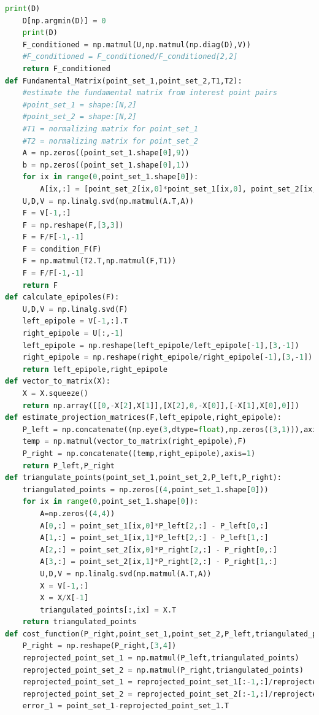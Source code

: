 \documentclass{article}
\begin{document}
\begin{lstlisting}[language=Python]
	print(D)
	D[np.argmin(D)] = 0
	print(D)
	F_conditioned = np.matmul(U,np.matmul(np.diag(D),V))
	#F_conditioned = F_conditioned/F_conditioned[2,2]
	return F_conditioned
def Fundamental_Matrix(point_set_1,point_set_2,T1,T2):
	#estimate the fundamental matrix from interest point pairs
	#point_set_1 = shape:[N,2]
	#point_set_2 = shape:[N,2]
	#T1 = normalizing matrix for point_set_1
	#T2 = normalizing matrix for point_set_2
	A = np.zeros((point_set_1.shape[0],9))
	b = np.zeros((point_set_1.shape[0],1))
	for ix in range(0,point_set_1.shape[0]):
		A[ix,:] = [point_set_2[ix,0]*point_set_1[ix,0], point_set_2[ix,0]*point_set_1[ix,1], point_set_2[ix,0], point_set_2[ix,1]*point_set_1[ix,0], point_set_2[ix,1]*point_set_1[ix,1], point_set_2[ix,1], point_set_1[ix,0], point_set_1[ix,1], 1]
	U,D,V = np.linalg.svd(np.matmul(A.T,A))
	F = V[-1,:]
	F = np.reshape(F,[3,3])
	F = F/F[-1,-1]
	F = condition_F(F)
	F = np.matmul(T2.T,np.matmul(F,T1))
	F = F/F[-1,-1]
	return F
def calculate_epipoles(F):
	U,D,V = np.linalg.svd(F)
	left_epipole = V[-1,:].T
	right_epipole = U[:,-1]
	left_epipole = np.reshape(left_epipole/left_epipole[-1],[3,-1])
	right_epipole = np.reshape(right_epipole/right_epipole[-1],[3,-1])
	return left_epipole,right_epipole
def vector_to_matrix(X):
	X = X.squeeze()
	return np.array([[0,-X[2],X[1]],[X[2],0,-X[0]],[-X[1],X[0],0]])
def estimate_projection_matrices(F,left_epipole,right_epipole):
	P_left = np.concatenate((np.eye(3,dtype=float),np.zeros((3,1))),axis=1)
	temp = np.matmul(vector_to_matrix(right_epipole),F)
	P_right = np.concatenate((temp,right_epipole),axis=1)
	return P_left,P_right
def triangulate_points(point_set_1,point_set_2,P_left,P_right):
	triangulated_points = np.zeros((4,point_set_1.shape[0]))
	for ix in range(0,point_set_1.shape[0]):
		A=np.zeros((4,4))
		A[0,:] = point_set_1[ix,0]*P_left[2,:] - P_left[0,:]
		A[1,:] = point_set_1[ix,1]*P_left[2,:] - P_left[1,:]
		A[2,:] = point_set_2[ix,0]*P_right[2,:] - P_right[0,:]
		A[3,:] = point_set_2[ix,1]*P_right[2,:] - P_right[1,:]
		U,D,V = np.linalg.svd(np.matmul(A.T,A))
		X = V[-1,:]
		X = X/X[-1]
		triangulated_points[:,ix] = X.T
	return triangulated_points
def cost_function(P_right,point_set_1,point_set_2,P_left,triangulated_points):
	P_right = np.reshape(P_right,[3,4])
	reprojected_point_set_1 = np.matmul(P_left,triangulated_points)
	reprojected_point_set_2 = np.matmul(P_right,triangulated_points)
	reprojected_point_set_1 = reprojected_point_set_1[:-1,:]/reprojected_point_set_1[-1,:]
	reprojected_point_set_2 = reprojected_point_set_2[:-1,:]/reprojected_point_set_2[-1,:]
	error_1 = point_set_1-reprojected_point_set_1.T

\end{lstlisting}
\end{document}
